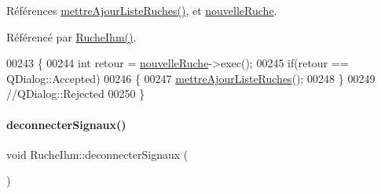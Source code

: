 Références \hyperlink{class_ruche_ihm_a77cb005fde7e2271e8721c23cef13b3e}{mettre\+Ajour\+Liste\+Ruches()}, et \hyperlink{class_ruche_ihm_a3a27b7af842244c6db3623f5f256bed5}{nouvelle\+Ruche}.



Référencé par \hyperlink{class_ruche_ihm_a04c2544ba4e9cca6c38f553c32d63dee}{Ruche\+Ihm()}.


\begin{DoxyCode}
00243 \{
00244     \textcolor{keywordtype}{int} retour = \hyperlink{class_ruche_ihm_a3a27b7af842244c6db3623f5f256bed5}{nouvelleRuche}->exec();
00245     \textcolor{keywordflow}{if}(retour == QDialog::Accepted)
00246     \{
00247         \hyperlink{class_ruche_ihm_a77cb005fde7e2271e8721c23cef13b3e}{mettreAjourListeRuches}();
00248     \}
00249     \textcolor{comment}{//QDialog::Rejected}
00250 \}
\end{DoxyCode}
\mbox{\label{class_ruche_ihm_a348a76106f3072dd31a382c6025b8113}} 
\paragraph{\texorpdfstring{deconnecter\+Signaux()}{deconnecterSignaux()}}
{\footnotesize\ttfamily void Ruche\+Ihm\+::deconnecter\+Signaux (\begin{DoxyParamCaption}{ }\end{DoxyParamCaption})\hspace{0.3cm}{\ttfamily [private]}}



